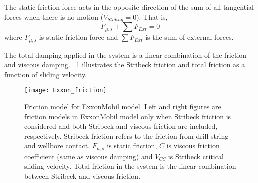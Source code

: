 The static friction force acts in the opposite direction of the sum of all tangential forces when there is no motion ($V_{Sliding}=0$).  That is,
\begin{equation}\label{zero}
  F_{\mu,s} + \sum F_{Ext} = 0
\end{equation}
where $F_{\mu,s}$ is static friction force and $\sum F_{Ext}$ is the sum of external forces.

%




The total damping applied in the system is a linear combination of the friction and viscous damping. \figurename~\ref{figure_Exxon_friction} illustrates the Stribeck friction and total friction as a function of sliding velocity.
\begin{figure}
	\centering
	\texttt{[image: Exxon\_friction]}
    \caption[Friction model for ExxonMobil model]{Friction model for ExxonMobil model. Left and right figures are friction models in ExxonMobil model only when Stribeck friction is considered and both Stribeck and viscous friction are included, respectively. Stribeck friction refers to the friction from drill string and wellbore contact. $F_{\mu, s}$ is static friction, $C$ is viscous friction coefficient (same as viscous damping) and $V_{CS}$ is Stribeck critical sliding velocity. Total friction in the system is the linear combination between Stribeck and viscous friction. }\label{figure_Exxon_friction}
\end{figure}

